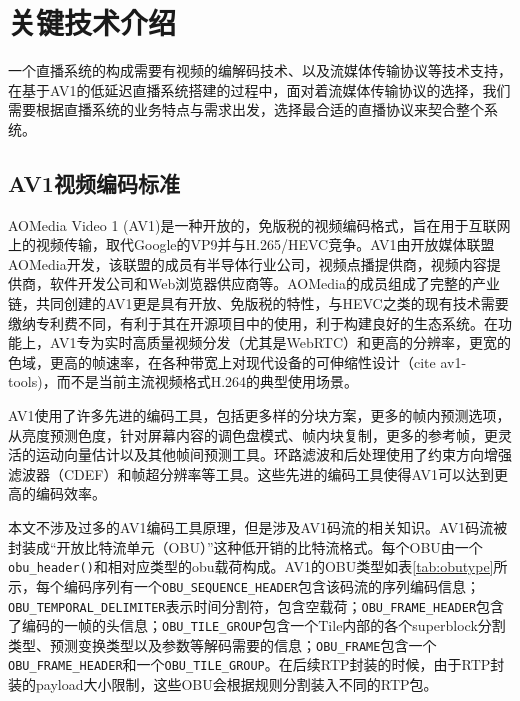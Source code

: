 
\chapter{关键技术介绍}

一个直播系统的构成需要有视频的编解码技术、以及流媒体传输协议等技术支持，在基于AV1的低延迟直播系统搭建的过程中，面对着流媒体传输协议的选择，我们需要根据直播系统的业务特点与需求出发，选择最合适的直播协议来契合整个系统。

\section{AV1视频编码标准}

AOMedia Video 1 (AV1)是一种开放的，免版税的视频编码格式，旨在用于互联网上的视频传输，取代Google的VP9并与H.265/HEVC竞争。AV1由开放媒体联盟AOMedia开发，该联盟的成员有半导体行业公司，视频点播提供商，视频内容提供商，软件开发公司和Web浏览器供应商等。AOMedia的成员组成了完整的产业链，共同创建的AV1更是具有开放、免版税的特性，与HEVC之类的现有技术需要缴纳专利费不同，有利于其在开源项目中的使用，利于构建良好的生态系统。在功能上，AV1专为实时高质量视频分发（尤其是WebRTC）和更高的分辨率，更宽的色域，更高的帧速率，在各种带宽上对现代设备的可伸缩性设计（cite av1-tools)，而不是当前主流视频格式H.264的典型使用场景。

AV1使用了许多先进的编码工具，包括更多样的分块方案，更多的帧内预测选项，从亮度预测色度，针对屏幕内容的调色盘模式、帧内块复制，更多的参考帧，更灵活的运动向量估计以及其他帧间预测工具。环路滤波和后处理使用了约束方向增强滤波器（CDEF）和帧超分辨率等工具。这些先进的编码工具使得AV1可以达到更高的编码效率。

本文不涉及过多的AV1编码工具原理，但是涉及AV1码流的相关知识。AV1码流被封装成“开放比特流单元（OBU）”这种低开销的比特流格式。每个OBU由一个\texttt{obu\_header()}和相对应类型的obu载荷构成。AV1的OBU类型如表\ref{tab:obutype}所示，每个编码序列有一个\texttt{OBU\_SEQUENCE\_HEADER}包含该码流的序列编码信息；\texttt{OBU\_TEMPORAL\_DELIMITER}表示时间分割符，包含空载荷；\texttt{OBU\_FRAME\_HEADER}包含了编码的一帧的头信息；\texttt{OBU\_TILE\_GROUP}包含一个Tile内部的各个superblock分割类型、预测变换类型以及参数等解码需要的信息；\texttt{OBU\_FRAME}包含一个\texttt{OBU\_FRAME\_HEADER}和一个\texttt{OBU\_TILE\_GROUP}。在后续RTP封装的时候，由于RTP封装的payload大小限制，这些OBU会根据规则分割装入不同的RTP包。


